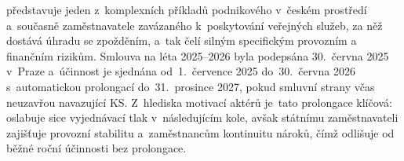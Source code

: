 
představuje jeden z~komplexních příkladů podnikového  v~českém prostředí a~současně zaměstnavatele zavázaného k~poskytování veřejných služeb, za něž dostává úhradu se zpožděním, a~tak čelí silným specifickým provozním a finančním rizikům.
Smlouva na léta 2025--2026 byla podepsána 30.~června 2025 v~Praze a~účinnost je sjednána od~1.~července 2025 do~30.~června 2026 s~automatickou prolongací do~31.~prosince 2027, pokud smluvní strany včas neuzavřou navazující \acs{KS}.
Z~hlediska motivací aktérů je~tato prolongace klíčová: oslabuje sice vyjednávací tlak v~následujícím kole, avšak státnímu zaměstnavateli zajišťuje provozní stabilitu a~zaměstnancům kontinuitu nároků, čímž odlišuje   od běžné roční účinnosti bez prolongace.\par



